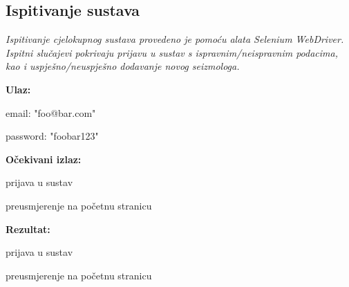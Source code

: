 			
			
			\subsection{Ispitivanje sustava}
			
			 \textit{Ispitivanje cjelokupnog sustava provedeno je pomoću alata Selenium WebDriver. Ispitni slučajevi pokrivaju prijavu u sustav s ispravnim/neispravnim podacima, kao i uspješno/neuspješno dodavanje novog seizmologa.\\ }
			 
			 \noindent {}
			 \begin{packed_item}

				 \item \textbf{Ulaz:}

				 \item[] \begin{packed_enum}
					\item email: "foo@bar.com"
					\item password: "foobar123"
				\end{packed_enum}

				  \item \textbf{Očekivani izlaz:}

				 \item[] \begin{packed_enum}
					\item prijava u sustav
					\item preusmjerenje na početnu stranicu
				\end{packed_enum}
				 
				\item \textbf{Rezultat:}

				\item[] \begin{packed_enum}
					\item prijava u sustav
					\item preusmjerenje na početnu stranicu
			   \end{packed_enum}

			 \end{packed_item}
